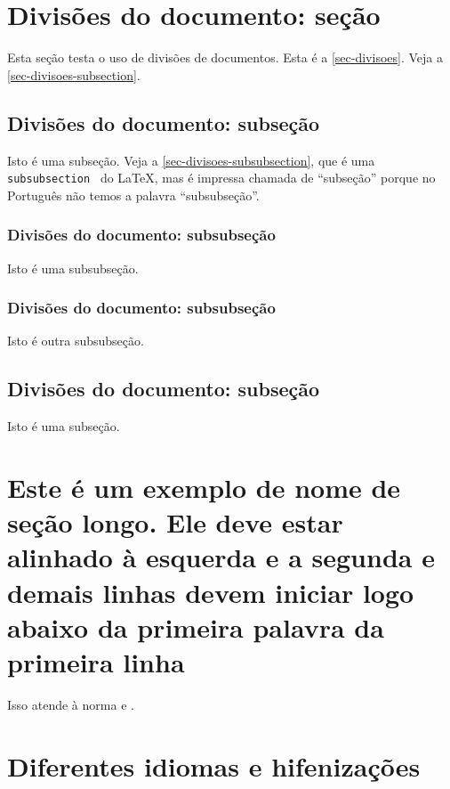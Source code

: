 \section{Divisões do documento: seção}%
\label{sec-divisoes}

Esta seção testa o uso de divisões de documentos. Esta é a
\autoref{sec-divisoes}. Veja a \autoref{sec-divisoes-subsection}.

\subsection{Divisões do documento: subseção}%
\label{sec-divisoes-subsection}

Isto é uma subseção. Veja a \autoref{sec-divisoes-subsubsection}, que é uma
\texttt{subsubsection  } do \LaTeX{}, mas é impressa chamada de ``subseção''
porque no Português não temos a palavra ``subsubseção''.

\subsubsection{Divisões do documento: subsubseção}%
\label{sec-divisoes-subsubsection}

Isto é uma subsubseção.

\subsubsection{Divisões do documento: subsubseção}

Isto é outra subsubseção.

\subsection{Divisões do documento: subseção}%
\label{sec-exemplo-subsec}

Isto é uma subseção.

\section[Exemplo muito longo]{Este é um exemplo de nome de seção longo. Ele deve
estar alinhado à esquerda e a segunda e demais linhas devem iniciar logo abaixo
da primeira palavra da primeira linha }

Isso atende à norma \textcite[seções de 5.2.2 a 5.2.4]{NBR14724:2011}
e \textcite[seções de 3.1 a 3.8]{NBR6024:2012}.

\section{Diferentes idiomas e hifenizações}%
\label{sec-hifenizacao}

